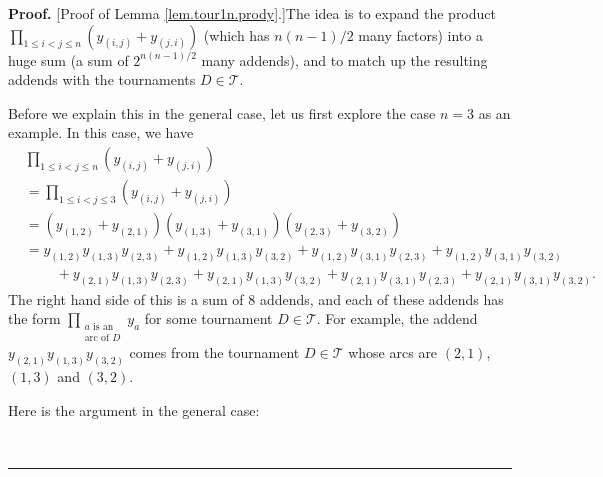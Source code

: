 \documentclass[numbers=enddot,12pt,final,onecolumn,notitlepage]{scrartcl}%
\numberwithin{exer}{subsection}
\theoremstyle{definition}
\newenvironment{fineprint}{\begin{small}}{\end{small}}
\newenvironment{proof}[1][Proof]{\noindent\textbf{#1.} }{\ \rule{0.5em}{0.5em}}
\let\prodnonlimits\prod
\renewcommand{\prod}{\prodnonlimits\limits}
\begin{document}
\begin{proof}
[Proof of Lemma \ref{lem.tour1n.prody}.]The idea is to expand the product
$\prod_{1\leq i<j\leq n}\left(  y_{\left(  i,j\right)  }+y_{\left(
j,i\right)  }\right)  $ (which has $n\left(  n-1\right)  /2$ many factors)
into a huge sum (a sum of $2^{n\left(  n-1\right)  /2}$ many addends), and to
match up the resulting addends with the tournaments $D\in\mathcal{T}$.

Before we explain this in the general case, let us first explore the case
$n=3$ as an example. In this case, we have%
\begin{align*}
&  \prod_{1\leq i<j\leq n}\left(  y_{\left(  i,j\right)  }+y_{\left(
j,i\right)  }\right) \\
&  =\prod_{1\leq i<j\leq3}\left(  y_{\left(  i,j\right)  }+y_{\left(
j,i\right)  }\right) \\
&  =\left(  y_{\left(  1,2\right)  }+y_{\left(  2,1\right)  }\right)  \left(
y_{\left(  1,3\right)  }+y_{\left(  3,1\right)  }\right)  \left(  y_{\left(
2,3\right)  }+y_{\left(  3,2\right)  }\right) \\
&  =y_{\left(  1,2\right)  }y_{\left(  1,3\right)  }y_{\left(  2,3\right)
}+y_{\left(  1,2\right)  }y_{\left(  1,3\right)  }y_{\left(  3,2\right)
}+y_{\left(  1,2\right)  }y_{\left(  3,1\right)  }y_{\left(  2,3\right)
}+y_{\left(  1,2\right)  }y_{\left(  3,1\right)  }y_{\left(  3,2\right)  }\\
&  \ \ \ \ \ \ \ \ \ \ +y_{\left(  2,1\right)  }y_{\left(  1,3\right)
}y_{\left(  2,3\right)  }+y_{\left(  2,1\right)  }y_{\left(  1,3\right)
}y_{\left(  3,2\right)  }+y_{\left(  2,1\right)  }y_{\left(  3,1\right)
}y_{\left(  2,3\right)  }+y_{\left(  2,1\right)  }y_{\left(  3,1\right)
}y_{\left(  3,2\right)  }.
\end{align*}
The right hand side of this is a sum of $8$ addends, and each of these addends
has the form $\prod_{\substack{a\text{ is an}\\\text{arc of }D}}y_{a}$ for
some tournament $D\in\mathcal{T}$. For example, the addend $y_{\left(
2,1\right)  }y_{\left(  1,3\right)  }y_{\left(  3,2\right)  }$ comes from the
tournament $D\in\mathcal{T}$ whose arcs are $\left(  2,1\right)  $, $\left(
1,3\right)  $ and $\left(  3,2\right)  $.

\begin{fineprint}
Here is the argument in the general case:


\end{fineprint}
\end{proof}
\end{document}
